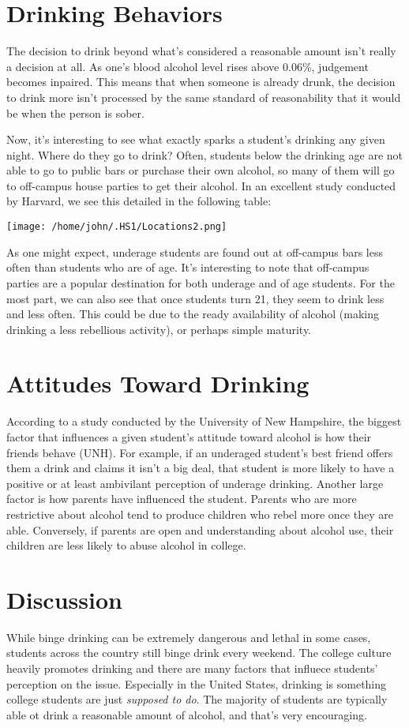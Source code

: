 \documentclass[12pt, man]{apa6}
\begin{document}
\section{Drinking Behaviors}
The decision to drink beyond what's considered a reasonable amount isn't really a decision at all. As one's blood alcohol level rises above 0.06\%, judgement becomes inpaired. This means that when someone is already drunk, the decision to drink more isn't processed by the same standard of reasonability that it would be when the person is sober.

Now, it's interesting to see what exactly sparks a student's drinking any given night. Where do they go to drink? Often, students below the drinking age are not able to go to public bars or purchase their own alcohol, so many of them will go to off-campus house parties to get their alcohol. In an excellent study conducted by Harvard, we see this detailed in the following table:\\
\vspace{5 mm}
\centerline{\texttt{[image: /home/john/.HS1/Locations2.png]}}

As one might expect, underage students are found out at off-campus bars less often than students who are of age. It's interesting to note that off-campus parties are a popular destination for both underage and of age students. For the most part, we can also see that once students turn 21, they seem to drink less and less often. This could be due to the ready availability of alcohol (making drinking a less rebellious activity), or perhaps simple maturity.

\section{Attitudes Toward Drinking}
According to a study conducted by the University of New Hampshire, the biggest factor that influences a given student's attitude toward alcohol is how their friends behave (UNH). For example, if an underaged student's best friend offers them a drink and claims it isn't a big deal, that student is more likely to have a positive or at least ambivilant perception of underage drinking. Another large factor is how parents have influenced the student. Parents who are more restrictive about alcohol tend to produce children who rebel more once they are able. Conversely, if parents are open and understanding about alcohol use, their children are less likely to abuse alcohol in college.

\section{Discussion}
While binge drinking can be extremely dangerous and lethal in some cases, students across the country still binge drink every weekend. The college culture heavily promotes drinking and there are many factors that influece students' perception on the issue. Especially in the United States, drinking is something college students are just \textit{supposed to do}. The majority of students are typically able ot drink a reasonable amount of alcohol, and that's very encouraging.



\end{document}
